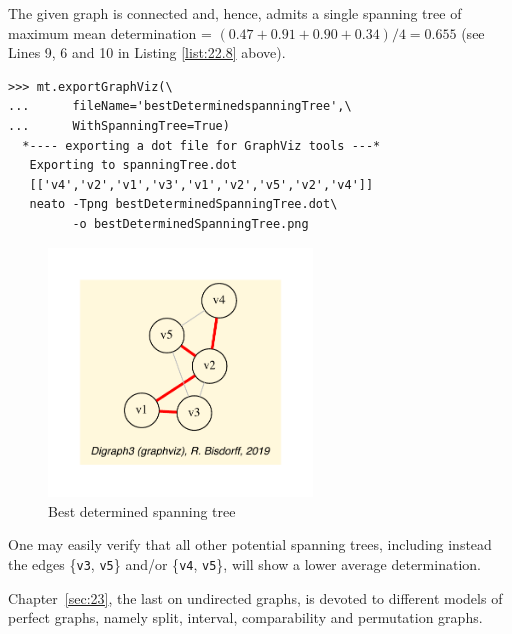 The given graph is connected and, hence, admits a single spanning tree of maximum mean determination = $(0.47 + 0.91 + 0.90 + 0.34)/4 = 0.655$ (see Lines 9, 6 and 10 in Listing \ref{list:22.8} above).
\begin{lstlisting}
>>> mt.exportGraphViz(\
...      fileName='bestDeterminedspanningTree',\
...      WithSpanningTree=True)
  *---- exporting a dot file for GraphViz tools ---*
   Exporting to spanningTree.dot
   [['v4','v2','v1','v3','v1','v2','v5','v2','v4']]
   neato -Tpng bestDeterminedSpanningTree.dot\
         -o bestDeterminedSpanningTree.png
\end{lstlisting}
\begin{figure}[h]
\sidecaption[t]
\includegraphics[width=7cm]{Figures/bestDeterminedSpanningTree.pdf}
\caption{Best determined spanning tree} 
\label{fig:22.7}       %
\end{figure}

One may easily verify that all other potential spanning trees, including instead the edges \{\texttt{v3}, \texttt{v5}\} and/or \{\texttt{v4}, \texttt{v5}\}, will show a lower average determination.

\vspace{1cm}

Chapter~\ref{sec:23}, the last on undirected graphs, is devoted to different models of perfect graphs, namely split, interval, comparability and permutation graphs. 
 
\clearpage


%